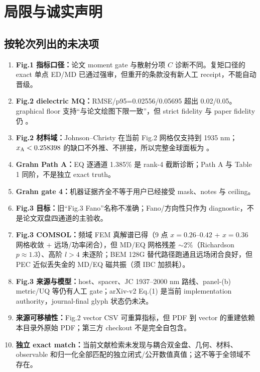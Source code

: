 \section{局限与诚实声明}

\subsection{按轮次列出的未决项}

\begin{enumerate}
  \item \textbf{Fig.1 指标口径：}论文 moment gate 与散射分项 $C$ 诊断不同。复矩口径的 exact 单点 ED/MD 已通过强审，但重开的条款没有新人工 receipt，不能自动晋级。
  \item \textbf{Fig.2 dielectric MQ：}RMSE/p95=0.02556/0.05695 超出 0.02/0.05。graphical floor 支持“与论文绘图下限一致”，但 strict fidelity 与 paper fidelity 仍 。
  \item \textbf{Fig.2 材料域：}Johnson--Christy 在当前 Fig.2 网格仅支持到 1935 nm；$x_{\rm A}<0.258398$ 的缺口不外推、不拼接，所以完整金球面板为 。
  \item \textbf{Grahn Path A：}EQ 逐通道 1.385\% 是 rank-4 截断诊断；Path A 与 Table 1 同阶，不是独立 exact truth。
  \item \textbf{Grahn gate 4：}机器证据齐全不等于用户已经接受 mask、notes 与  ceiling。
  \item \textbf{Fig.3 目标：}旧“Fig.3 Fano”名称不准确；Fano/方向性只作为 diagnostic，不是论文双盘四通道的主验收。
  \item \textbf{Fig.3 COMSOL：}频域 FEM 真解谱已得（9 点 $x=0.26$--$0.42$ + $x=0.36$ 网格收敛 + 远场/功率闭合），但 MD/EQ 网格残差 $\sim2\%$（Richardson $p\approx1.3$）、高阶 $l>4$ 未逐阶；BEM 128G 替代路径跑通且远场闭合良好，但 PEC 近似丢失金的 MD/EQ 磁共振（须 IBC 加损耗）。
  \item \textbf{Fig.3 来源与模型：}host、spacer、JC 1937--2000 nm 路线、panel-(b) metric/UQ 等仍有人工 gate；arXiv-v2 Eq.(1) 是当前 implementation authority，journal-final glyph 状态仍未决。
  \item \textbf{来源可移植性：}Fig.2 vector CSV 可重算指标，但 PDF 到 vector 的重建依赖本目录外原始 PDF；第三方 checkout 不是完全自包含。
  \item \textbf{独立 exact match：}当前文献检索未发现与耦合双金盘、几何、材料、observable 和归一化全部匹配的独立闭式/公开数值真值；这不等于全领域不存在。
\end{enumerate}

